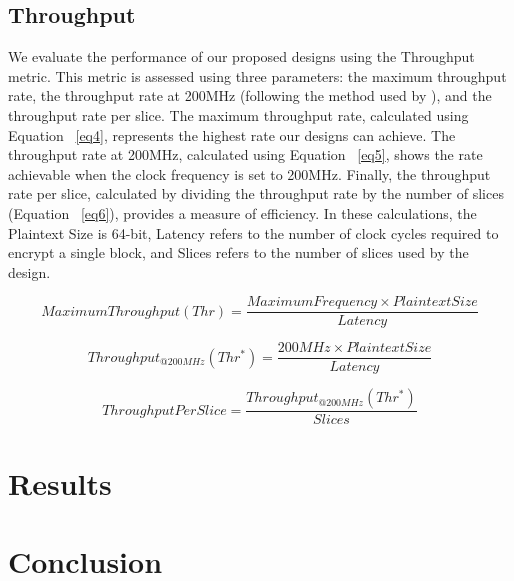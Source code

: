 \documentclass[sn-basic]{sn-jnl}%
\begin{document}
\subsection{Throughput}\label{subsec6}
We evaluate the performance of our proposed designs using the Throughput metric. 
This metric is assessed using three parameters: the maximum throughput rate, the throughput rate at 200MHz (following the method used by \cite{ghosh2017lightweight}), and the throughput rate per slice. 
The maximum throughput rate, calculated using Equation ~\ref{eq4}, represents the highest rate our designs can achieve. 
The throughput rate at 200MHz, calculated using Equation ~\ref{eq5}, shows the rate achievable when the clock frequency is set to 200MHz. 
Finally, the throughput rate per slice, calculated by dividing the throughput rate by the number of slices (Equation ~\ref{eq6}), provides a measure of efficiency. 
In these calculations, the Plaintext Size is 64-bit, Latency refers to the number of clock cycles required to encrypt a single block, and Slices refers to the number of slices used by the design.

\begin{equation}
    Maximum Throughput(Thr) = \frac{Maximum Frequency \times Plaintext Size}{Latency} 
    \label{eq4}
\end{equation}

\begin{equation}
    Throughput_{@200MHz}(Thr^*) = \frac{200MHz \times Plaintext Size}{Latency} 
    \label{eq5}
\end{equation}

\begin{equation}
    ThroughputPerSlice = \frac{Throughput_{@200MHz}(Thr^*)}{Slices} 
    \label{eq6}
\end{equation}

\section{Results}\label{sec5}


\section{Conclusion}\label{sec6}

\end{document}

